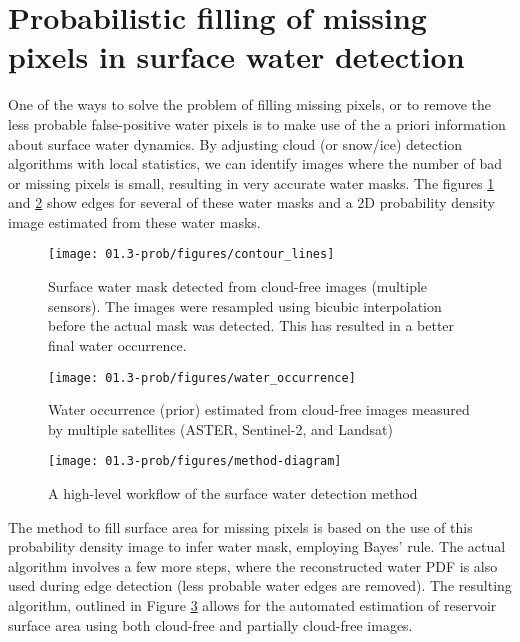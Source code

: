 \section{Probabilistic filling of missing pixels in surface water detection}

One of the ways to solve the problem of filling missing pixels, or to remove the less probable false-positive water pixels is to make use of the a priori information about surface water dynamics. By adjusting cloud (or snow/ice) detection algorithms with local statistics, we can identify images where the number of bad or missing pixels is small, resulting in very accurate water masks. The figures \ref{fig:prob-water-isolines} and \ref{fig:prob-water-density} show edges for several of these water masks and a 2D probability density image estimated from these water masks.

\begin{figure}[H]
	\centering
	\texttt{[image: 01.3-prob/figures/contour\_lines]}
	\caption{Surface water mask detected from cloud-free images (multiple sensors). The images were resampled using bicubic interpolation before the actual mask was detected. This has resulted in a better final water occurrence.}
	\label{fig:prob-water-isolines}
\end{figure}


\begin{figure}[H]
	\centering
	\texttt{[image: 01.3-prob/figures/water\_occurrence]}
	\caption{Water occurrence (prior) estimated from cloud-free images measured by multiple satellites (ASTER, Sentinel-2, and Landsat)}
	\label{fig:prob-water-density}
\end{figure}

\begin{figure}[H]
	\centering
	\texttt{[image: 01.3-prob/figures/method-diagram]}
	\caption{A high-level workflow of the surface water detection method}
	\label{fig:prob-workflow}
\end{figure}

The method to fill surface area for missing pixels is based on the use of this probability density image to infer water mask, employing Bayes' rule. The actual algorithm involves a few more steps, where the reconstructed water \gls{PDF} is also used during edge detection (less probable water edges are removed). The resulting algorithm, outlined in Figure \ref{fig:prob-workflow} allows for the automated estimation of reservoir surface area using both cloud-free and partially cloud-free images. 

